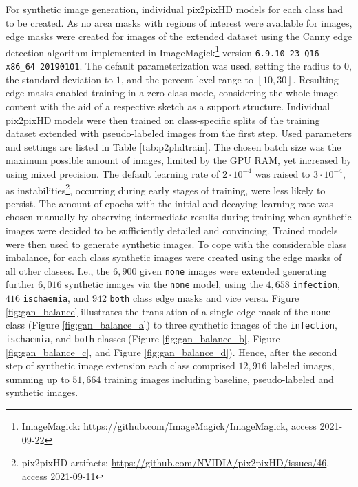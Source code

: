 \documentclass[runningheads]{llncs}
\begin{document}
For synthetic image generation, individual pix2pixHD models for each class had to be created. As no area masks with regions of interest were available for images, edge masks were created for images of the extended dataset using the Canny edge detection algorithm \cite{canny1986} implemented in ImageMagick\footnote{ImageMagick: \url{https://github.com/ImageMagick/ImageMagick}, access 2021-09-22} version \texttt{6.9.10-23 Q16 x86\_64 20190101}. The default parameterization was used, setting the radius to $0$, the standard deviation to $1$, and the percent level range to $[10, 30]$. Resulting edge masks enabled training in a zero-class mode, considering the whole image content with the aid of a respective sketch as a support structure. Individual pix2pixHD models were then trained on class-specific splits of the training dataset extended with pseudo-labeled images from the first step. Used parameters and settings are listed in Table \ref{tab:p2phdtrain}. The chosen batch size was the maximum possible amount of images, limited by the GPU RAM, yet increased by using mixed precision. The default learning rate of $2\cdot 10^{-4}$ was raised to $3\cdot 10^{-4}$, as instabilities\footnote{pix2pixHD artifacts: \url{https://github.com/NVIDIA/pix2pixHD/issues/46}, access 2021-09-11}, occurring during early stages of training, were less likely to persist. The amount of epochs with the initial and decaying learning rate was chosen manually by observing intermediate results during training when synthetic images were decided to be sufficiently detailed and convincing.
Trained models were then used to generate synthetic images. To cope with the considerable class imbalance, for each class synthetic images were created using the edge masks of all other classes. I.e., the $6,900$ given \texttt{none} images were extended generating further $6,016$ synthetic images via the \texttt{none} model, using the $4,658$ \texttt{infection}, $416$ \texttt{ischaemia}, and $942$ \texttt{both} class edge masks and vice versa. Figure \ref{fig:gan_balance} illustrates the translation of a single edge mask of the \texttt{none} class (Figure \ref{fig:gan_balance_a}) to three synthetic images of the \texttt{infection}, \texttt{ischaemia}, and \texttt{both} classes (Figure \ref{fig:gan_balance_b}, Figure \ref{fig:gan_balance_c}, and Figure \ref{fig:gan_balance_d}). Hence, after the second step of synthetic image extension each class comprised $12,916$ labeled images, summing up to $51,664$ training images including baseline, pseudo-labeled and synthetic images.
\end{document}
